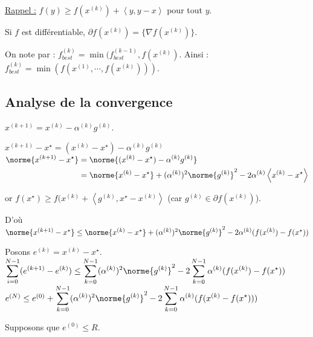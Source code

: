 \documentclass[12pt,a4paper]{article}
\begin{document}
	\underline{Rappel :} $f(y) \geq f(x^{(k)})+\left<y,y-x\right>$ pour tout $y$.
	
	\begin{rmq}
		Si $f$ est différentiable, $\partial f(x^{(k)}) = \{\nabla f(x^{(k)})\}$.
	\end{rmq}
	
	On note par : $f^{(k)}_{best} = \min(f_{best}^{(k-1)},f(x^{(k)})$. Ainsi : $f_{best}^{(k)} = \min(f(x^{(1)},\cdots,f(x^{(k)})))$.
	
	\subsection{Analyse de la convergence}
	
	$x^{(k+1)} = x^{(k)} - \alpha^{(k)}g^{(k)}$.
	
	$x^{(k+1)} - x^{\star} = (x^{(k)}-x^{\star}) -\alpha^{(k)}g^{(k)}$\\
	$\begin{aligned}
		\norme{x^{(k+1)}-x^\star} &= \norme{(x^{(k)}-x^\star) - \alpha^{(k)}g^{(k)}}\\
		&= \norme{x^{(k)}-x^\star} + (\alpha^{(k)})^2\norme{g^{(k)}}^2 - 2 \alpha^{(k)}\left<x^{(k)}-x^\star\right>
	\end{aligned}$
	
	or $f(x^\star) \geq f(x^{(k)}+\left<g^{(k)},x^\star-x^{(k)}\right>$ (car $g^{(k)} \in \partial f(x^{(k)})$).
	
	D'où $\norme{x^{(k+1)}-x^{\star}} \leq\norme{x^{(k)}-x^\star} + (\alpha^{(k)})^2\norme{g^{(k)}}^2 - 2 \alpha^{(k)}(f(x^{(k)})-f(x^\star))$
	
	Posons $e^{(k)} = x^{(k)} - x^{\star}$.\\
	$\displaystyle\sum_{i=0}^{N-1} (e^{(k+1)}-e^{(k)}) \leq \sum_{k=0}^{N-1} (\alpha^{(k)})^2 \norme{g^{(k)}}^2-2\sum_{k=0}^{N-1} \alpha^{(k)}(f(x^{(k)})-f(x^\star))$\\
	$e^{(N)}\leq e^{(0)} + \displaystyle\sum_{k=0}^{N-1} (\alpha^{(k)})^2 \norme{g^{(k)}}^2 - 2\sum_{k=0}^{N-1} \alpha^{(k)}(f(x^{(k)}-f(x^\star)))$
	
	\begin{rmq}
		Supposons que $e^{(0)} \leq R$.
	\end{rmq}
	
\end{document}
